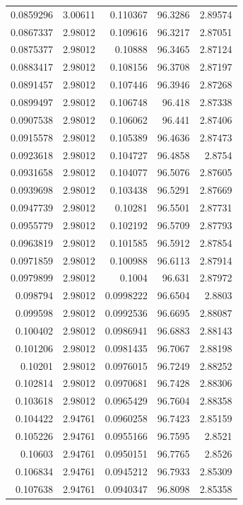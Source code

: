 \begin{tabular}{rrrrr}
0.0859296 & 3.00611 &  0.110367 &  96.3286 & 2.89574 \\
0.0867337 & 2.98012 &  0.109616 &  96.3217 & 2.87051 \\
0.0875377 & 2.98012 &   0.10888 &  96.3465 & 2.87124 \\
0.0883417 & 2.98012 &  0.108156 &  96.3708 & 2.87197 \\
0.0891457 & 2.98012 &  0.107446 &  96.3946 & 2.87268 \\
0.0899497 & 2.98012 &  0.106748 &   96.418 & 2.87338 \\
0.0907538 & 2.98012 &  0.106062 &   96.441 & 2.87406 \\
0.0915578 & 2.98012 &  0.105389 &  96.4636 & 2.87473 \\
0.0923618 & 2.98012 &  0.104727 &  96.4858 &  2.8754 \\
0.0931658 & 2.98012 &  0.104077 &  96.5076 & 2.87605 \\
0.0939698 & 2.98012 &  0.103438 &  96.5291 & 2.87669 \\
0.0947739 & 2.98012 &   0.10281 &  96.5501 & 2.87731 \\
0.0955779 & 2.98012 &  0.102192 &  96.5709 & 2.87793 \\
0.0963819 & 2.98012 &  0.101585 &  96.5912 & 2.87854 \\
0.0971859 & 2.98012 &  0.100988 &  96.6113 & 2.87914 \\
0.0979899 & 2.98012 &    0.1004 &   96.631 & 2.87972 \\
 0.098794 & 2.98012 & 0.0998222 &  96.6504 &  2.8803 \\
 0.099598 & 2.98012 & 0.0992536 &  96.6695 & 2.88087 \\
 0.100402 & 2.98012 & 0.0986941 &  96.6883 & 2.88143 \\
 0.101206 & 2.98012 & 0.0981435 &  96.7067 & 2.88198 \\
  0.10201 & 2.98012 & 0.0976015 &  96.7249 & 2.88252 \\
 0.102814 & 2.98012 & 0.0970681 &  96.7428 & 2.88306 \\
 0.103618 & 2.98012 & 0.0965429 &  96.7604 & 2.88358 \\
 0.104422 & 2.94761 & 0.0960258 &  96.7423 & 2.85159 \\
 0.105226 & 2.94761 & 0.0955166 &  96.7595 &  2.8521 \\
  0.10603 & 2.94761 & 0.0950151 &  96.7765 &  2.8526 \\
 0.106834 & 2.94761 & 0.0945212 &  96.7933 & 2.85309 \\
 0.107638 & 2.94761 & 0.0940347 &  96.8098 & 2.85358 \\

\end{tabular}
